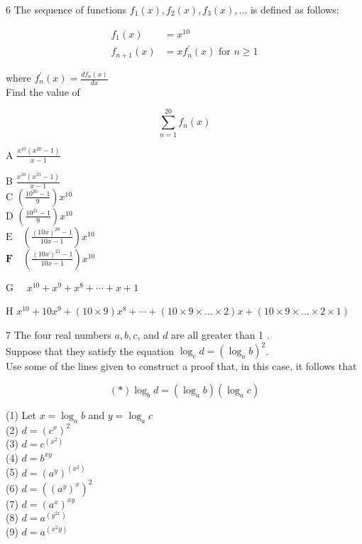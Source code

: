 \documentclass[10pt]{article}
\begin{document}
6 The sequence of functions $f_{1}(x), f_{2}(x), f_{3}(x), \ldots$ is defined as follows:

$$
\begin{aligned}
f_{1}(x) & =x^{10} \\
f_{n+1}(x) & =x f_{n}^{\prime}(x) \text { for } n \geq 1
\end{aligned}
$$

where $f_{n}^{\prime}(x)=\frac{d f_{n}(x)}{d x}$\\
Find the value of

$$
\sum_{n=1}^{20} f_{n}(x)
$$

A $\frac{x^{10}\left(x^{20}-1\right)}{x-1}$

B $\frac{x^{10}\left(x^{21}-1\right)}{x-1}$\\
C $\left(\frac{10^{20}-1}{9}\right) x^{10}$\\
D $\left(\frac{10^{21}-1}{9}\right) x^{10}$\\
$\mathrm{E} \quad\left(\frac{(10 x)^{20}-1}{10 x-1}\right) x^{10}$\\
$\mathbf{F} \quad\left(\frac{(10 x)^{21}-1}{10 x-1}\right) x^{10}$

G $\quad x^{10}+x^{9}+x^{8}+\cdots+x+1$

H $x^{10}+10 x^{9}+(10 \times 9) x^{8}+\cdots+(10 \times 9 \times \ldots \times 2) x+(10 \times 9 \times \ldots \times 2 \times 1)$

7 The four real numbers $a, b, c$, and $d$ are all greater than 1 .\\
Suppose that they satisfy the equation $\log _{c} d=\left(\log _{a} b\right)^{2}$.\\
Use some of the lines given to construct a proof that, in this case, it follows that

$$
(*) \log _{b} d=\left(\log _{a} b\right)\left(\log _{a} c\right)
$$

(1) Let $x=\log _{a} b$ and $y=\log _{a} c$\\
(2) $d=\left(c^{x}\right)^{2}$\\
(3) $d=c^{\left(x^{2}\right)}$\\
(4) $d=b^{x y}$\\
(5) $d=\left(a^{y}\right)^{\left(x^{2}\right)}$\\
(6) $d=\left(\left(a^{y}\right)^{x}\right)^{2}$\\
(7) $d=\left(a^{x}\right)^{x y}$\\
(8) $d=a^{\left(y^{2 x}\right)}$\\
(9) $d=a^{\left(x^{2} y\right)}$
\end{document}
